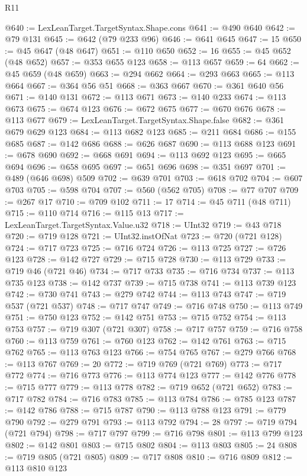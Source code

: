 \begin{lexlean}{R11}
\begin{coremodule}
@640 := LexLeanTarget.TargetSyntax.Shape.cons
@641 := @490 @640
@642 := @79 @131
@645 := @642 (@79 @233 @96)
@646 := @641 @645
@647 := 15
@650 := @45 @647 (@48 @647)
@651 := @110 @650
@652 := 16
@655 := @45 @652 (@48 @652)
@657 := @353 @655 @123
@658 := @113 @657
@659 := 64
@662 := @45 @659 (@48 @659)
@663 := @294 @662
@664 := @293 @663
@665 := @113 @664
@667 := @364 @56 @51
@668 := @363 @667
@670 := @361 @640 @56
@671 := @140 @131
@672 := @113 @671
@673 := @140 @233
@674 := @113 @673
@675 := @674 @123
@676 := @672 @675
@677 := @670 @676
@678 := @113 @677
@679 := LexLeanTarget.TargetSyntax.Shape.false
@682 := @361 @679 @629 @123
@684 := @113 @682 @123
@685 := @211 @684
@686 := @155 @685
@687 := @142 @686
@688 := @626 @687
@690 := @113 @688 @123
@691 := @678 @690
@692 := @668 @691
@694 := @113 @692 @123
@695 := @665 @694
@696 := @658 @695
@697 := @651 @696
@698 := @351 @697
@701 := @489 (@646 @698) @509
@702 := @639 @701
@703 := @618 @702
@704 := @607 @703
@705 := @598 @704
@707 := @560 (@562 @705)
@708 := @77 @707
@709 := @267 @17
@710 := @709 @102
@711 := 17
@714 := @45 @711 (@48 @711)
@715 := @110 @714
@716 := @115 @13
@717 := LexLeanTarget.TargetSyntax.Value.u32
@718 := UInt32
@719 := @43 @718
@720 := @719 @128
@721 := UInt32.instOfNat
@723 := @720 (@721 @128)
@724 := @717 @723
@725 := @716 @724
@726 := @113 @725
@727 := @726 @123
@728 := @142 @727
@729 := @715 @728
@730 := @113 @729
@733 := @719 @46 (@721 @46)
@734 := @717 @733
@735 := @716 @734
@737 := @113 @735 @123
@738 := @142 @737
@739 := @715 @738
@741 := @113 @739 @123
@742 := @730 @741
@743 := @279 @742
@744 := @113 @743
@747 := @719 @537 (@721 @537)
@748 := @717 @747
@749 := @716 @748
@750 := @113 @749
@751 := @750 @123
@752 := @142 @751
@753 := @715 @752
@754 := @113 @753
@757 := @719 @307 (@721 @307)
@758 := @717 @757
@759 := @716 @758
@760 := @113 @759
@761 := @760 @123
@762 := @142 @761
@763 := @715 @762
@765 := @113 @763 @123
@766 := @754 @765
@767 := @279 @766
@768 := @113 @767
@769 := 20
@772 := @719 @769 (@721 @769)
@773 := @717 @772
@774 := @716 @773
@776 := @113 @774 @123
@777 := @142 @776
@778 := @715 @777
@779 := @113 @778
@782 := @719 @652 (@721 @652)
@783 := @717 @782
@784 := @716 @783
@785 := @113 @784
@786 := @785 @123
@787 := @142 @786
@788 := @715 @787
@790 := @113 @788 @123
@791 := @779 @790
@792 := @279 @791
@793 := @113 @792
@794 := 28
@797 := @719 @794 (@721 @794)
@798 := @717 @797
@799 := @716 @798
@801 := @113 @799 @123
@802 := @142 @801
@803 := @715 @802
@804 := @113 @803
@805 := 24
@808 := @719 @805 (@721 @805)
@809 := @717 @808
@810 := @716 @809
@812 := @113 @810 @123

\end{coremodule}
\end{lexlean}
